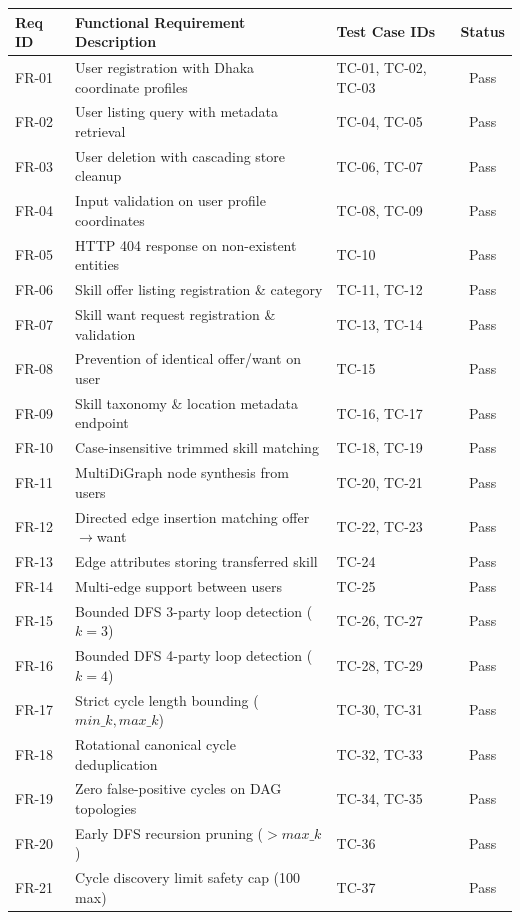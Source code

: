\documentclass[12pt,a4paper]{report}
\begin{document}
\begin{longtable}{p{1.4cm} p{7.5cm} p{3.8cm} c}
\toprule
\textbf{Req ID} & \textbf{Functional Requirement Description} & \textbf{Test Case IDs} & \textbf{Status} \\
\midrule
\endhead
FR-01 & User registration with Dhaka coordinate profiles & TC-01, TC-02, TC-03 & Pass \\
FR-02 & User listing query with metadata retrieval & TC-04, TC-05 & Pass \\
FR-03 & User deletion with cascading store cleanup & TC-06, TC-07 & Pass \\
FR-04 & Input validation on user profile coordinates & TC-08, TC-09 & Pass \\
FR-05 & HTTP 404 response on non-existent entities & TC-10 & Pass \\
FR-06 & Skill offer listing registration \& category & TC-11, TC-12 & Pass \\
FR-07 & Skill want request registration \& validation & TC-13, TC-14 & Pass \\
FR-08 & Prevention of identical offer/want on user & TC-15 & Pass \\
FR-09 & Skill taxonomy \& location metadata endpoint & TC-16, TC-17 & Pass \\
FR-10 & Case-insensitive trimmed skill matching & TC-18, TC-19 & Pass \\
FR-11 & MultiDiGraph node synthesis from users & TC-20, TC-21 & Pass \\
FR-12 & Directed edge insertion matching offer$\rightarrow$want & TC-22, TC-23 & Pass \\
FR-13 & Edge attributes storing transferred skill & TC-24 & Pass \\
FR-14 & Multi-edge support between users & TC-25 & Pass \\
FR-15 & Bounded DFS 3-party loop detection ($k=3$) & TC-26, TC-27 & Pass \\
FR-16 & Bounded DFS 4-party loop detection ($k=4$) & TC-28, TC-29 & Pass \\
FR-17 & Strict cycle length bounding ($min\_k, max\_k$) & TC-30, TC-31 & Pass \\
FR-18 & Rotational canonical cycle deduplication & TC-32, TC-33 & Pass \\
FR-19 & Zero false-positive cycles on DAG topologies & TC-34, TC-35 & Pass \\
FR-20 & Early DFS recursion pruning ($> max\_k$) & TC-36 & Pass \\
FR-21 & Cycle discovery limit safety cap (100 max) & TC-37 & Pass \\

\end{longtable}
\end{document}
